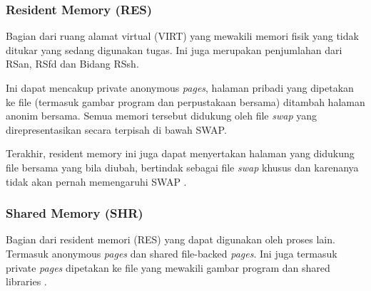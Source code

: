 \subsubsection{Resident Memory (RES)}

Bagian dari ruang alamat virtual (VIRT) yang mewakili memori fisik yang tidak ditukar yang sedang digunakan tugas. Ini juga merupakan penjumlahan dari RSan, RSfd dan
Bidang RSsh.

Ini dapat mencakup private anonymous \textit{pages}, halaman pribadi yang dipetakan ke file (termasuk
gambar program dan perpustakaan bersama) ditambah halaman anonim bersama. Semua memori tersebut didukung oleh file \textit{swap} yang direpresentasikan secara terpisah di bawah SWAP.

Terakhir, resident memory ini juga dapat menyertakan halaman yang didukung file bersama yang bila diubah, bertindak sebagai file \textit{swap} khusus dan karenanya tidak akan pernah memengaruhi SWAP .





\subsubsection{Shared Memory (SHR)}

Bagian dari resident memori (RES) yang dapat digunakan oleh proses lain. Termasuk anonymous \textit{pages} dan shared file-backed \textit{pages}. Ini juga termasuk private \textit{pages} dipetakan ke file yang mewakili gambar program dan shared libraries . 


